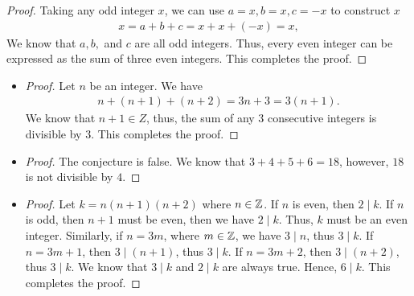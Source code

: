 \documentclass[8pt]{article}
\begin{document}
\begin{Answer}[number=2.2.2]
\begin{itemize}
\begin{proof}
        Taking any odd integer $x$, we can use $a = x, b = x, c = -x$ to construct
        $x$
        \begin{align*}
          x = a + b + c = x + x + (-x) = x,
        \end{align*}
        We know that $a, b,$ and $c$ are all odd integers. Thus, every even
        integer can be expressed as the sum of three even integers. This
        completes the proof.
      \end{proof}
  \end{itemize}
\end{Answer}

\begin{Answer}[number=2.2.3]
  \begin{itemize}
    \item
      \begin{proof}
        Let $n$ be an integer. We have
        \begin{align*}
          n + (n+1) + (n+2) = 3n + 3 = 3(n+1).
        \end{align*}
        We know that $n+1\in Z$, thus, the sum of any $3$ consecutive integers
        is divisible by $3$. This completes the proof.
      \end{proof}
    \item
      \begin{proof}
        The conjecture is false. We know that $3+4+5+6 = 18$, however, $18$ is
        not divisible by $4$.
      \end{proof}
    \item
      \begin{proof}
        Let $k=n(n+1)(n+2)$ where $n\in \mathbb{Z}$. If $n$ is even, then $2\mid k$. If
        $n$ is odd, then $n+1$ must be even, then we have $2\mid k$. Thus, $k$
        must be an even integer. Similarly, if $n = 3m$, where $m\in \mathbb{Z}$, we
        have $3\mid n$, thus $3\mid k$. If $n = 3m+1$, then $3\mid (n+1)$, thus
        $3\mid k$. If $n = 3m+2$, then $3\mid (n+2)$, thus $3\mid k$. We know
        that $3\mid k$ and $2\mid k$ are always true. Hence, $6\mid k$. This
        completes the proof.
      \end{proof}
  \end{itemize}
\end{Answer}
\end{document}

